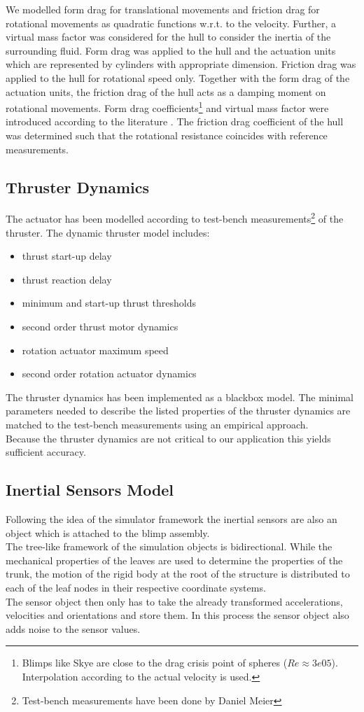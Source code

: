 We modelled form drag for translational movements and friction drag for rotational movements as quadratic functions w.r.t. to the velocity.
Further, a virtual mass factor was considered for the hull to consider the inertia of the surrounding fluid.
Form drag was applied to the hull and the actuation units which are represented by cylinders with appropriate dimension.
Friction drag was applied to the hull for rotational speed only.
Together with the form drag of the actuation units, the friction drag of the hull acts as a damping moment on rotational movements.
Form drag coefficients\footnote{
Blimps like Skye are close to the drag crisis point of spheres ($Re\approx3e05$). Interpolation according to the actual velocity is used.} and virtual mass factor were introduced according to the literature \citep{Kundu2012}.
The friction drag coefficient of the hull was determined such that the rotational resistance coincides with reference measurements.

\subsection{Thruster Dynamics}
\label{sub:thrust_dynamics}
The actuator has been modelled according to test-bench measurements\footnote{Test-bench measurements have been done by Daniel Meier} of the thruster.
The dynamic thruster model includes:
\begin{itemize}
\item thrust start-up delay
\item thrust reaction delay
\item minimum and start-up thrust thresholds
\item second order thrust motor dynamics
\item rotation actuator maximum speed
\item second order rotation actuator dynamics
\end{itemize}
The thruster dynamics has been implemented as a blackbox model.
The minimal parameters needed to describe the listed properties of the thruster dynamics are matched to the test-bench measurements using an empirical approach.  \\
Because the thruster dynamics are not critical to our application this yields sufficient accuracy.

\subsection{Inertial Sensors Model}
\label{sub:imu_model}
Following the idea of the simulator framework the inertial sensors are also an object which is attached to the blimp assembly. \\
The tree-like framework of the simulation objects is bidirectional.
While the mechanical properties of the leaves are used to determine the properties of the trunk,
the motion of the rigid body at the root of the structure is distributed to each of the leaf nodes in their respective coordinate systems. \\
The sensor object then only has to take the already transformed accelerations, velocities and orientations and store them.
In this process the sensor object also adds noise to the sensor values.

